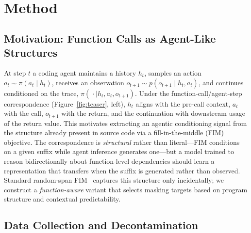 
\section{Method}
\label{sec:method}
\vspace{-0.5ex}

\subsection{Motivation: Function Calls as Agent-Like Structures}
\label{sec:method:motivation}

At step $t$ a coding agent maintains a history $h_t$, samples an action
$a_t \sim \pi(a_t \mid h_t)$, receives an observation
$o_{t+1} \sim p(o_{t+1} \mid h_t, a_t)$, and continues conditioned on the
trace, $\pi(\,\cdot \mid h_t, a_t, o_{t+1})$. Under the
function-call/agent-step correspondence (Figure~\ref{fig:teaser}, left),
$h_t$ aligns with the pre-call context, $a_t$ with the call, $o_{t+1}$
with the return, and the continuation with downstream usage of the
return value. This motivates extracting an agentic conditioning signal
from the structure already present in source code via a fill-in-the-middle
(FIM) objective. The correspondence is \emph{structural} rather than
literal---FIM conditions on a given suffix while agent inference
generates one---but a model trained to reason bidirectionally about
function-level dependencies should learn a representation that transfers
when the suffix is generated rather than observed. Standard random-span
FIM~\citep{qwencoder, deepseekcoder, starcoder} captures this structure
only incidentally; we construct a \emph{function-aware} variant that
selects masking targets based on program structure and contextual
predictability.

\vspace{-0.5ex}
\subsection{Data Collection and Decontamination}
\label{sec:method:data}

